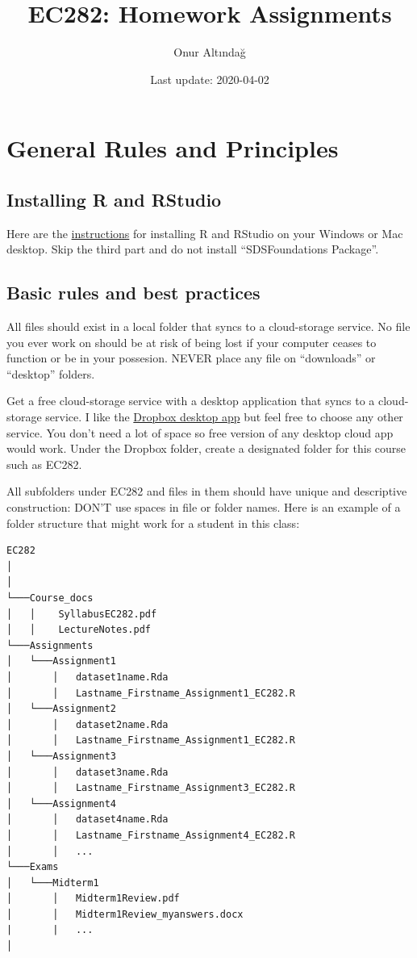 \documentclass[
]{book}
\title{EC282: Homework Assignments}
\author{Onur Altındağ}
\date{Last update: 2020-04-02}
\begin{document}
\frontmatter
\maketitle

{
\setcounter{tocdepth}{1}
\tableofcontents
}
\mainmatter
\hypertarget{general-rules-and-principles}{%
\chapter{General Rules and Principles}\label{general-rules-and-principles}}

\hypertarget{installing-r-and-rstudio}{%
\section{Installing R and RStudio}\label{installing-r-and-rstudio}}

Here are the \href{https://courses.edx.org/courses/UTAustinX/UT.7.01x/3T2014/56c5437b88fa43cf828bff5371c6a924/}{instructions} for installing R and RStudio on your Windows or Mac desktop. Skip the third part and do not install ``SDSFoundations Package''.

\hypertarget{basic-rules-and-best-practices}{%
\section{Basic rules and best practices}\label{basic-rules-and-best-practices}}

All files should exist in a local folder that syncs to a cloud-storage service. No file you ever work on should be at risk of being lost if your computer ceases to function or be in your possesion. NEVER place any file on ``downloads'' or ``desktop'' folders.

Get a free cloud-storage service with a desktop application that syncs to a cloud-storage service. I like the \href{https://help.dropbox.com/installs-integrations/desktop/desktop-application-overview}{Dropbox desktop app} but feel free to choose any other service. You don't need a lot of space so free version of any desktop cloud app would work. Under the Dropbox folder, create a designated folder for this course such as EC282.

All subfolders under EC282 and files in them should have unique and descriptive construction: DON'T use spaces in file or folder names. Here is an example of a folder structure that might work for a student in this class:

\begin{verbatim}
EC282
│  
│
└───Course_docs
│   │    SyllabusEC282.pdf
│   │    LectureNotes.pdf 
└───Assignments
│   └───Assignment1
│       │   dataset1name.Rda
│       │   Lastname_Firstname_Assignment1_EC282.R
│   └───Assignment2
│       │   dataset2name.Rda
│       │   Lastname_Firstname_Assignment1_EC282.R
│   └───Assignment3
│       │   dataset3name.Rda
│       │   Lastname_Firstname_Assignment3_EC282.R
│   └───Assignment4
│       │   dataset4name.Rda
│       │   Lastname_Firstname_Assignment4_EC282.R
│       │   ...
└───Exams
│   └───Midterm1
│       │   Midterm1Review.pdf
│       │   Midterm1Review_myanswers.docx
|       |   ...
│   
\end{verbatim}
\end{document}
